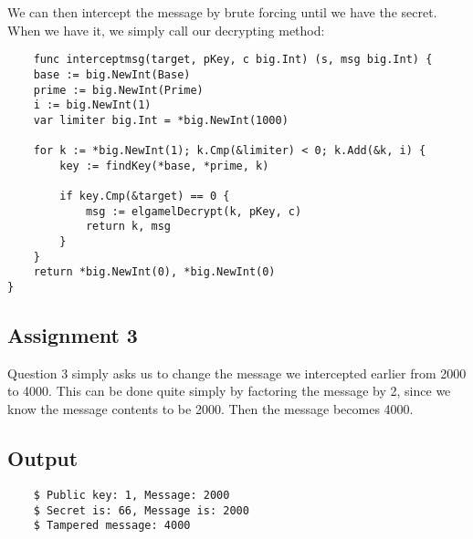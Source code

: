 \documentclass{article}
\begin{document}
We can then intercept the message by brute forcing until we have the secret. When we have it, we simply call our decrypting method:

\begin{lstlisting}
    func interceptmsg(target, pKey, c big.Int) (s, msg big.Int) {
	base := big.NewInt(Base)
	prime := big.NewInt(Prime)
	i := big.NewInt(1)
	var limiter big.Int = *big.NewInt(1000)

	for k := *big.NewInt(1); k.Cmp(&limiter) < 0; k.Add(&k, i) {
		key := findKey(*base, *prime, k)

		if key.Cmp(&target) == 0 {
			msg := elgamelDecrypt(k, pKey, c)
			return k, msg
		}
	}
	return *big.NewInt(0), *big.NewInt(0)
}
\end{lstlisting}

\subsection{Assignment 3}
Question 3 simply asks us to change the message we intercepted earlier from 2000 to 4000. This can be done quite simply by factoring the message by 2, since we know the message contents to be 2000. Then the message becomes 4000.

\subsection{Output}
\begin{lstlisting}
    $ Public key: 1, Message: 2000
    $ Secret is: 66, Message is: 2000
    $ Tampered message: 4000
\end{lstlisting}


\end{document}

